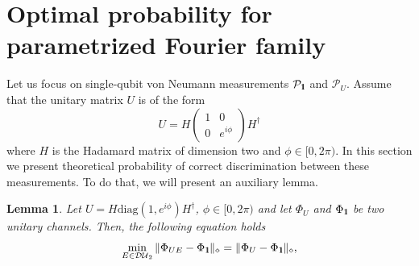 \documentclass[preprint,12pt, a4paper, dvipsnames]{elsarticle}
\newcommand{\1}{{\rm 1\hspace{-0.9mm}l}}
\newcommand{\Id}{{\rm 1\hspace{-0.9mm}l}}
\newcommand{\ee}{\ensuremath{\mathrm{e}}}
\newcommand{\ii}{\ensuremath{\mathrm{i}}}
\newcommand{\PP}{\mathcal{P}}
\newcommand{\diaguni}{\ensuremath{\mathcal{DU}}}
\newcommand{\diag}{\mathrm{diag}}
\newtheorem{lemma}{Lemma}
\begin{document}
\section{Optimal probability for parametrized Fourier family} \label{app:optimal-probability}


Let us focus on single-qubit von Neumann measurements $\PP_\1$ and $\PP_U$.
Assume that the unitary matrix $U$ is of the form
\begin{equation}
U = H
\left(\begin{array}{cc}1&0\\0&e^{i \phi}\end{array}\right)  H^\dagger
\end{equation}
where $H$ is the Hadamard matrix of dimension two and $\phi \in [0, 2 \pi)$.
In this section we present theoretical probability of correct
discrimination between these measurements. To do that, we will present an auxiliary lemma.
\begin{lemma}\label{lemma:min-e-optimal}
	Let $U = H \diag(1, e^{i \phi}) H^\dagger$, $\phi \in [0, 2\pi)$ and	let
	$\Phi_U$ and $\Phi_\Id$ be two unitary channels. Then, the following equation holds
	\begin{equation}
	\min_{E \in \diaguni_2} \|\Phi_{UE} -
	\Phi_\Id\|_\diamond = \|\Phi_{U} -
	\Phi_\Id\|_\diamond,
	\end{equation}
\end{lemma}
\end{document}
